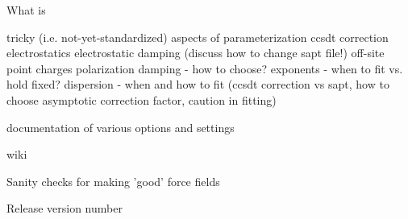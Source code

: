 What is \pointer


tricky (i.e. not-yet-standardized) aspects of parameterization
    ccsdt correction
    electrostatics
        electrostatic damping (discuss how to change sapt file!)
        off-site point charges
    polarization damping - how to choose?
    exponents - when to fit vs. hold fixed?
    dispersion - when and how to fit (ccsdt correction vs sapt, how to choose
        asymptotic correction factor, caution in fitting)

documentation of various options and settings

wiki

Sanity checks for making 'good' force fields

Release version number

